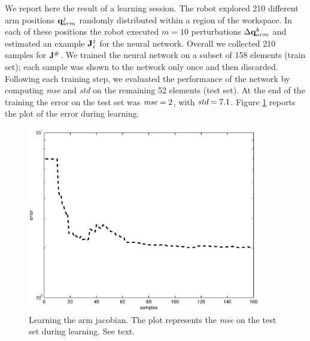 We report here the result of a learning session. The robot explored 210 
different arm positions $\mathbf q_{arm}^j$ randomly distributed within a region of 
the workspace. In each of these positions the robot executed $m=10$ 
perturbations $\Delta \mathbf {q}_{arm}^k$ and estimated an example $\mathbf J_i^j$ for 
the neural network. Overall we collected 210 samples for $\mathbf J^\#$. 
We trained the neural network on a subset of 158 elements (train set); each 
sample was shown to the network only once and then discarded. Following each 
training step, we evaluated the performance of the network by computing 
\emph{mse} and \emph{std} on the remaining 52 elements (test set). At the 
end of the training the error on the test set was $\emph{mse}=2$, with 
$\emph{std}=7.1$. Figure \ref{fig:jacobian-error} reports the plot of 
the error during learning.
%
\begin{figure}[tbp]
\centerline{
\includegraphics[width=4.0in, angle=0 ]{./Figure/jacobian-error.eps}
} \caption{Learning the arm jacobian. The plot represents the \emph{mse} on 
the test set during learning. See text.} \label{fig:jacobian-error}
\end{figure}
%



